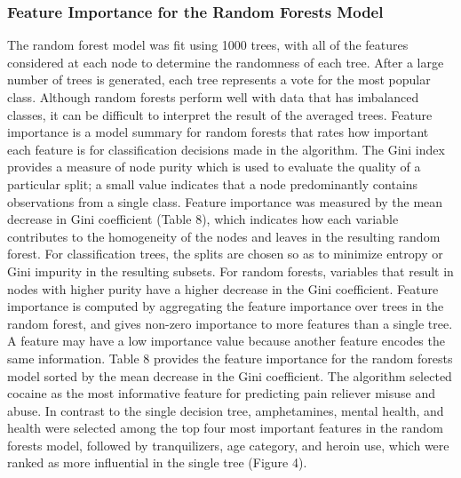 \documentclass[sigconf]{acmart}
\begin{document}
\subsubsection{Feature Importance for the Random Forests Model}

The random forest model was fit using 1000 trees, with all of the features 
considered at each node to determine the randomness of each tree. After a 
large number of trees is generated, each tree represents a vote for the
most popular class. Although random forests perform well with data that has
imbalanced classes, it can be difficult to interpret the result of the 
averaged trees. Feature importance is a model summary for random forests 
that rates how important each feature is for classification decisions made 
in the algorithm. The Gini index provides a measure of node purity which is 
used to evaluate the quality of a particular split; a small value indicates 
that a node predominantly contains observations from a single class. 
Feature importance was measured by the mean decrease in Gini coefficient 
(Table 8), which indicates how each variable contributes to the homogeneity 
of the nodes and leaves in the resulting random forest. For classification 
trees, the splits are chosen so as to minimize entropy or Gini impurity in 
the resulting subsets. For random forests, variables that result in nodes 
with higher purity have a higher decrease in the Gini coefficient. Feature 
importance is computed by aggregating the feature importance over trees in 
the random forest, and gives non-zero importance to more features than a 
single tree. A feature may have a low importance value because another feature 
encodes the same information. Table 8 provides the feature importance for 
the random forests model sorted by the mean decrease in the Gini coefficient. 
The algorithm selected cocaine as the most informative feature for predicting 
pain reliever misuse and abuse. In contrast to the single decision tree, 
amphetamines, mental health, and health were selected among the top four most 
important features in the random forests model, followed by tranquilizers, 
age category, and heroin use, which were ranked as more influential in the 
single tree (Figure 4). 

\end{document}
